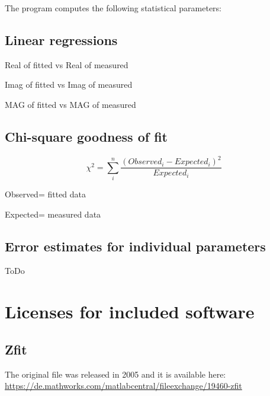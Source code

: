 \documentclass[10pt,a4paper]{memoir}
\begin{document}
The program computes the following statistical parameters:

\section{Linear regressions}

Real of fitted vs Real of measured

Imag of fitted vs Imag of measured

MAG of fitted vs MAG of measured

\section{Chi-square goodness of fit}

\[ \chi^2 = \sum_i^n{\dfrac{(Observed_i-Expected_i)^2}{Expected_i}} \]

Observed= fitted data

Expected= measured data

\section{Error estimates for individual parameters}

ToDo


\newpage{}
\chapter{Licenses for included software}

\section{Zfit}

The original file was released in 2005 and it is available here:\\

\url{https://de.mathworks.com/matlabcentral/fileexchange/19460-zfit}
\end{document}
